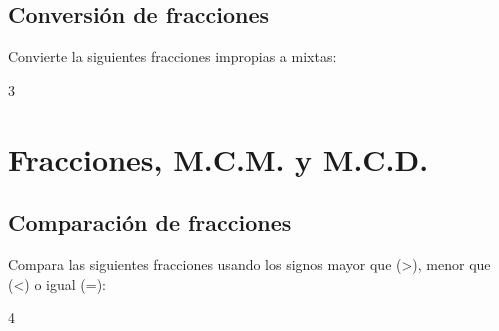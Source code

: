 \documentclass[12pt,addpoints]{evalua}
\begin{document}
\begin{questions}
	\subsection{Conversión de fracciones}

	\question[4] Convierte la siguientes fracciones impropias a mixtas:

	\begin{multicols}{3}
	\end{multicols}

	\section{Fracciones, M.C.M. y M.C.D.}

	\subsection{Comparación de fracciones}

	\question[8] Compara las siguientes fracciones usando los signos mayor que (>), menor que (<) o igual (=):

	\begin{multicols}{4}
\end{multicols}
\end{questions}
\end{document}

